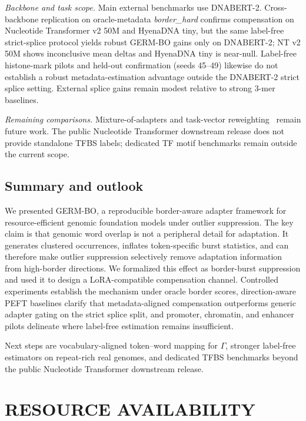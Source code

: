 \documentclass[12pt,letterpaper]{article}
\newcommand{\splitname}[1]{\textit{#1}}
\begin{document}
\emph{Backbone and task scope.} Main external benchmarks use DNABERT-2. Cross-backbone replication on oracle-metadata \splitname{border\_hard} confirms compensation on Nucleotide Transformer v2 50M and HyenaDNA tiny, but the same label-free strict-splice protocol yields robust GERM-BO gains only on DNABERT-2; NT v2 50M shows inconclusive mean deltas and HyenaDNA tiny is near-null. Label-free histone-mark pilots and held-out confirmation (seeds 45--49) likewise do not establish a robust metadata-estimation advantage outside the DNABERT-2 strict splice setting. External splice gains remain modest relative to strong $3$-mer baselines.

\emph{Remaining comparisons.} Mixture-of-adapters and task-vector reweighting~\cite{stickland2019bert,ilharco2022editing,he2022unified} remain future work. The public Nucleotide Transformer downstream release does not provide standalone TFBS labels; dedicated TF motif benchmarks remain outside the current scope.

\subsection*{Summary and outlook}

We presented GERM-BO, a reproducible border-aware adapter framework for resource-efficient genomic foundation models under outlier suppression. The key claim is that genomic word overlap is not a peripheral detail for adaptation. It generates clustered occurrences, inflates token-specific burst statistics, and can therefore make outlier suppression selectively remove adaptation information from high-border directions. We formalized this effect as border-burst suppression and used it to design a LoRA-compatible compensation channel. Controlled experiments establish the mechanism under oracle border scores, direction-aware PEFT baselines clarify that metadata-aligned compensation outperforms generic adapter gating on the strict splice split, and promoter, chromatin, and enhancer pilots delineate where label-free estimation remains insufficient.

Next steps are vocabulary-aligned token--word mapping for $\Gamma$, stronger label-free estimators on repeat-rich real genomes, and dedicated TFBS benchmarks beyond the public Nucleotide Transformer downstream release.


\newpage

\section*{RESOURCE AVAILABILITY}
\end{document}
